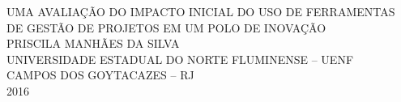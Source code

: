 \begin{titlepage}
 \begin{center}
   {\large UMA AVALIAÇÃO DO IMPACTO INICIAL DO USO DE FERRAMENTAS DE GESTÃO DE PROJETOS EM UM POLO DE INOVAÇÃO} \\ [7cm]
   {\large PRISCILA MANHÃES DA SILVA} \\ [4cm]
   \vfill
   {\large UNIVERSIDADE ESTADUAL DO NORTE FLUMINENSE – UENF} \\ [1cm]
   {\large CAMPOS DOS GOYTACAZES – RJ} \\
   {\large 2016}
 \end{center}
\end{titlepage}
